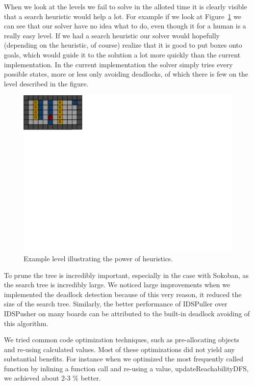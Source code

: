 \documentclass[a4paper,12pt]{article}
\renewcommand{\*}[0]{\cdot}
\begin{document}
When we look at the levels we fail to solve in the alloted time it is clearly
visible that a search heuristic would help a lot. For example if we look at
Figure~\ref{fig:level136} we can see that our solver have no idea what to do,
even though it for a human is a really easy level. If we had a search heuristic
our solver would hopefully (depending on the heuristic, of course) realize that
it is good to put boxes onto goals, which would guide it to the solution a lot
more quickly than the current implementation. In the current implementation the
solver simply tries every possible states, more or less only avoiding
deadlocks, of which there is few on the level described in the figure.

\begin{figure}[h!]
    \begin{center}
        \includegraphics{figures/level136}
    \end{center}
    \caption{Example level illustrating the power of heuristics.}
    \label{fig:level136}
\end{figure}

To prune the tree is incredibly important, especially in the case with Sokoban,
as the search tree is incredibly large. We noticed large improvements when we
implemented the deadlock detection because of this very reason, it reduced the
size of the search tree. Similarly, the better performance of IDSPuller over
IDSPusher on many boards can be attributed to the built-in deadlock avoiding of
this algorithm.

We tried common code optimization techniques, such as pre-allocating objects and
re-using calculated values. Most of these optimizations did not yield any
substantial benefits. For instance when we optimized the most frequently called
function by inlining a function call and re-using a value,
updateReachabilityDFS, we achieved about 2-3 \% better.
\end{document}
